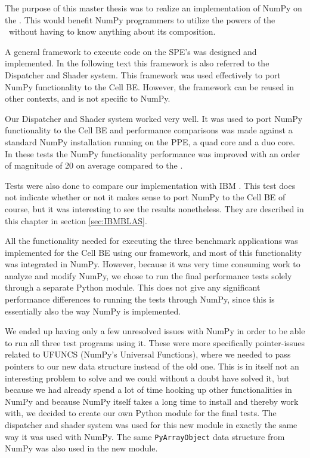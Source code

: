 The purpose of this master thesis was to realize an implementation of
NumPy on the \CBE{}. This would benefit NumPy programmers to utilize
the powers of the \CBE\ without having to know anything about its
composition. 

A general framework to execute code on the SPE's was designed and implemented.
In the following text this framework is also referred to the Dispatcher and Shader system.
This framework was used effectively to port NumPy functionality to the Cell BE.
However, the framework can be reused in other contexts, and is not specific to NumPy.

Our Dispatcher and Shader system worked very well. It was used to port
NumPy functionality to the Cell BE and performance comparisons was
made against a standard NumPy installation running on the PPE, a quad
core and a duo core. In these tests the NumPy functionality
performance was improved with an order of magnitude of 20 on
average compared to the \PPE{}.

Tests were also done to compare our implementation with
IBM \BLAS{}. This test does not indicate whether or not it makes sense
to port NumPy to the Cell BE of course, but it was interesting to see
the results nonetheless. They are described in this chapter in
section \ref{sec:IBMBLAS}.

All the functionality needed for executing the three benchmark
applications was implemented for the Cell BE using our framework, and
most of this functionality was integrated in NumPy. However, because
it was very time consuming work to analyze and modify NumPy, we chose
to run the final performance tests solely through a separate Python
module. This does not give any significant performance differences to
running the tests through NumPy, since this is essentially also the
way NumPy is implemented.

We ended up having only a few unresolved issues with NumPy in order to
be able to run all three test programs using it. These were
more specifically pointer-issues related to UFUNCS (NumPy's Universal
Functions), where we needed to pass pointers to our new data structure
instead of the old one. This is in itself not an interesting problem
to solve and we could without a doubt have solved it, but because we
had already spend a lot of time hooking up other functionalities in
NumPy and because NumPy itself takes a long time to install and
thereby work with, we decided to create our own Python module for the
final tests. The dispatcher and shader system was used for this new
module in exactly the same way it was used with NumPy. The
same \texttt{PyArrayObject} data structure from NumPy was also used in
the new module. \\

